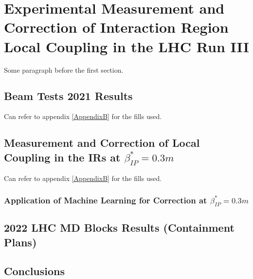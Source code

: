 
\chapter{Experimental Measurement and Correction of Interaction Region Local Coupling in the LHC Run III} %

\label{Chapter5} %


Some paragraph before the first section.


\section{Beam Tests 2021 Results}

Can refer to appendix \ref{AppendixB} for the fills used.

\section{Measurement and Correction of Local Coupling in the IRs at $\beta^{*}_{IP} = 0.3m$}

Can refer to appendix \ref{AppendixB} for the fills used.

\subsection{Application of Machine Learning for Correction at $\beta^{*}_{IP} = 0.3m$}


\section{2022 LHC MD Blocks Results (Containment Plans)}


\section{Conclusions}

